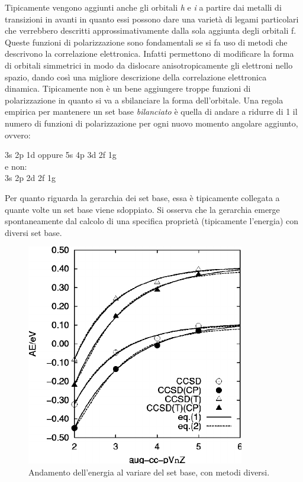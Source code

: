 \documentclass[oneside]{amsbook}
\numberwithin{section}{chapter}
\numberwithin{equation}{section}
\numberwithin{figure}{section}
\begin{document}
Tipicamente vengono aggiunti anche gli orbitali \textit{h} e \textit{i} a partire dai metalli di transizioni in avanti in quanto essi possono dare una varietà di legami particolari che verrebbero descritti approssimativamente dalla sola aggiunta degli orbitali f. 
Queste funzioni di polarizzazione sono fondamentali se si fa uso di metodi che descrivono la correlazione elettronica. Infatti permettono di modificare la forma di orbitali simmetrici in modo da dislocare anisotropicamente gli elettroni nello spazio, dando così una migliore descrizione della correlazione elettronica dinamica. Tipicamente non è un bene aggiungere troppe funzioni di polarizzazione in quanto si va a sbilanciare la forma dell'orbitale. Una regola empirica per mantenere un set base \emph{bilanciato } è quella di andare a ridurre di 1 il numero di funzioni di polarizzazione per ogni nuovo momento angolare aggiunto, ovvero: 
\begin{center}
3s 2p 1d oppure 5s 4p 3d 2f 1g \\ 
e non: \\
3s 2p 2d 2f 1g  \\
\end{center}
Per quanto riguarda la gerarchia dei set base, essa è tipicamente collegata a quante volte un set base viene sdoppiato. Si osserva che la gerarchia emerge spontaneamente dal calcolo di una specifica proprietà (tipicamente l'energia) con diversi set base.

\begin{figure}[H]
\centering
\caption{Andamento dell'energia al variare del set base, con metodi diversi.}\label{oz}
\includegraphics[scale=0.6]{ndz}
\end{figure}
\end{document}
